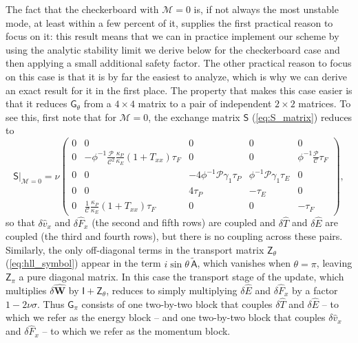 \documentclass[preprint,12pt,authoryear]{elsarticle}
\newcommand{\tenA}{\mathsf{A}}
\newcommand{\tenS}{\mathsf{S}}
\newcommand{\tenI}{\mathsf{I}}
\newcommand{\tenG}{\mathsf{G}}
\newcommand{\tenZ}{\mathsf{Z}}
\newcommand{\hE}{\hat{E}}
\newcommand{\hv}{\hat{v}}
\newcommand{\hF}{\hat{F}}
\newcommand{\hT}{\hat{T}}
\newcommand{\hvecW}{{\hat{\mathbf{W}}}}
\newcommand{\calC}{\mathcal{C}}
\newcommand{\calP}{\mathcal{P}}
\newcommand{\calM}{\mathcal{M}}
\begin{document}
The fact that the checkerboard with $\calM = 0$ is, if not always the most unstable mode, at least within a few percent of it, supplies the first practical reason to focus on it: this result means that we can in practice implement our scheme by using the analytic stability limit we derive below for the checkerboard case and then applying a small additional safety factor. The other practical reason to focus on this case is that it is by far the easiest to analyze, which is why we can derive an exact result for it in the first place. The property that makes this case easier is that it reduces $\tenG_\theta$ from a $4\times 4$ matrix to a pair of independent $2\times 2$ matrices. To see this, first note that for $\calM = 0$, the exchange matrix $\tenS$ (\autoref{eq:S_matrix}) reduces to
\begin{equation}
\tenS\big|_{\calM = 0} = \nu
    \left(\begin{array}{ccccc}
    0 & 0 & 0 & 0 & 0 \\
    0 & -\phi^{-1}\frac{\calP}{\calC^2}\frac{\kappa_P}{\kappa_E} (1+T_{xx})\tau_F & 0 & 0 & \phi^{-1}\frac{\calP}{\calC}\tau_F \\
    0 & 0 & -4\phi^{-1}\calP\gamma_1\tau_P & \phi^{-1}\calP\gamma_1\tau_E & 0 \\
    0 & 0 & 4\tau_P & -\tau_E & 0 \\
    0 & \frac{1}{\calC}\frac{\kappa_P}{\kappa_E}(1+T_{xx})\tau_F & 0 & 0 & -\tau_F
    \end{array}\right),
    \label{eq:S_static}
\end{equation}
so that $\delta\hv_x$ and $\delta\hF_x$ (the second and fifth rows) are coupled and $\delta\hT$ and $\delta\hE$ are coupled (the third and fourth rows), but there is no coupling across these pairs. Similarly, the only off-diagonal terms in the transport matrix $\tenZ_\theta$ (\autoref{eq:hll_symbol}) appear in the term $i\sin\theta \,\tilde{\tenA}$, which vanishes when $\theta = \pi$, leaving $\tenZ_\pi$ a pure diagonal matrix. In this case the transport stage of the update, which multiplies $\delta\hvecW$ by $\tenI + \tenZ_\theta$, reduces to simply multiplying $\delta\hE$ and $\delta\hF_x$ by a factor $1-2\nu\sigma$. Thus $\tenG_\pi$ consists of one two-by-two block that couples $\delta\hT$ and $\delta\hE$ -- to which we refer as the energy block -- and one two-by-two block that couples $\delta\hv_x$ and $\delta\hF_x$ -- to which we refer as the momentum block.
\end{document}
